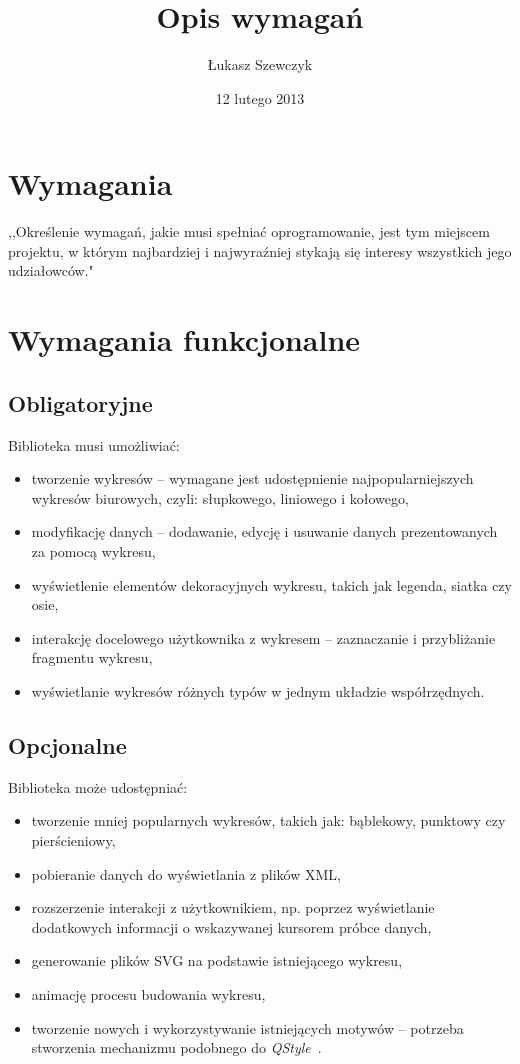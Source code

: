 \documentclass[11pt,twoside,a4paper,final]{llncs}
\begin{document}
\date{12 lutego 2013}
\title{Opis wymagań}

\author{Łukasz Szewczyk}
\maketitle

\section{Wymagania}
,,Określenie wymagań, jakie musi spełniać oprogramowanie, jest tym miejscem projektu, w którym najbardziej i najwyraźniej stykają się interesy wszystkich jego udziałowców."~\cite{sacha-wymagania}

\section{Wymagania funkcjonalne}
\subsection{Obligatoryjne}
Biblioteka musi umożliwiać:
\begin{itemize}
\item{tworzenie wykresów -- wymagane jest udostępnienie najpopularniejszych wykresów biurowych, czyli: słupkowego, liniowego i kołowego,}
\item{modyfikację danych -- dodawanie, edycję i usuwanie danych prezentowanych za pomocą wykresu,}
\item{wyświetlenie elementów dekoracyjnych wykresu, takich jak legenda, siatka czy osie,}
\item{interakcję docelowego użytkownika z wykresem -- zaznaczanie i przybliżanie fragmentu wykresu,}
\item{wyświetlanie wykresów różnych typów w jednym układzie współrzędnych.}
\end{itemize}

\subsection{Opcjonalne}
Biblioteka może udostępniać:
\begin{itemize}
\item{tworzenie mniej popularnych wykresów, takich jak: bąblekowy, punktowy czy pierścieniowy,}
\item{pobieranie danych do wyświetlania z plików XML,}
\item{rozszerzenie interakcji z użytkownikiem, np. poprzez wyświetlanie dodatkowych informacji o wskazywanej kursorem próbce danych,}
\item{generowanie plików SVG na podstawie istniejącego wykresu,}
\item{animację procesu budowania wykresu,}
\item{tworzenie nowych i wykorzystywanie istniejących motywów -- potrzeba stworzenia mechanizmu podobnego do \textit{QStyle}~\cite{qstyle}.}
\end{itemize}
\end{document}
